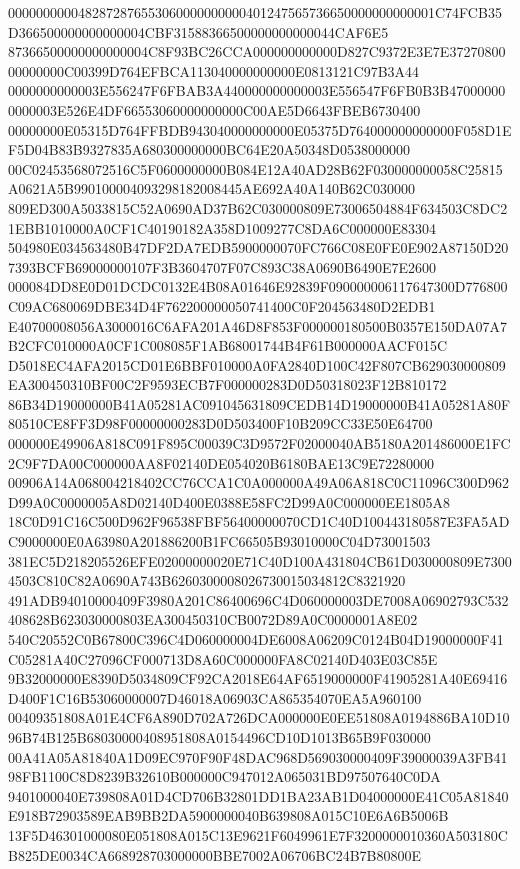 \documentclass[UTF8,fontset=fandol,zihao=-4,a4paper]{ctexart}
\begin{document}
{{0000000000482872876553060000000000401247565736650000000000001C74FCB35D366500000000000004CBF31588366500000000000044CAF6E5
87366500000000000004C8F93BC26CCA000000000000D827C9372E3E7E3727080000000000C00399D764EFBCA113040000000000E0813121C97B3A44
0000000000003E556247F6FBAB3A440000000000003E556547F6FB0B3B470000000000003E526E4DF66553060000000000C00AE5D6643FBEB6730400
00000000E05315D764FFBDB943040000000000E05375D764000000000000F058D1EF5D04B83B9327835A680300000000BC64E20A50348D0538000000
00C02453568072516C5F0600000000B084E12A40AD28B62F030000000058C25815A0621A5B990100004093298182008445AE692A40A140B62C030000
809ED300A5033815C52A0690AD37B62C030000809E73006504884F634503C8DC21EBB1010000A0CF1C40190182A358D1009277C8DA6C000000E83304
504980E034563480B47DF2DA7EDB5900000070FC766C08E0FE0E902A87150D207393BCFB69000000107F3B3604707F07C893C38A0690B6490E7E2600
000084DD8E0D01DCDC0132E4B08A01646E92839F090000006117647300D776800C09AC680069DBE34D4F762200000050741400C0F204563480D2EDB1
E40700008056A3000016C6AFA201A46D8F853F000000180500B0357E150DA07A7B2CFC010000A0CF1C008085F1AB68001744B4F61B000000AACF015C
D5018EC4AFA2015CD01E6BBF010000A0FA2840D100C42F807CB629030000809EA300450310BF00C2F9593ECB7F000000283D0D50318023F12B810172
86B34D19000000B41A05281AC091045631809CEDB14D19000000B41A05281A80F80510CE8FF3D98F00000000283D0D503400F10B209CC33E50E64700
000000E49906A818C091F895C00039C3D9572F02000040AB5180A201486000E1FC2C9F7DA00C000000AA8F02140DE054020B6180BAE13C9E72280000
00906A14A068004218402CC76CCA1C0A000000A49A06A818C0C11096C300D962D99A0C0000005A8D02140D400E0388E58FC2D99A0C000000EE1805A8
18C0D91C16C500D962F96538FBF56400000070CD1C40D100443180587E3FA5ADC9000000E0A63980A201886200B1FC66505B93010000C04D73001503
381EC5D218205526EFE02000000020E71C40D100A431804CB61D030000809E73004503C810C82A0690A743B6260300008026730015034812C8321920
491ADB94010000409F3980A201C86400696C4D060000003DE7008A06902793C532408628B623030000803EA300450310CB0072D89A0C0000001A8E02
540C20552C0B67800C396C4D060000004DE6008A06209C0124B04D19000000F41C05281A40C27096CF000713D8A60C000000FA8C02140D403E03C85E
9B32000000E8390D5034809CF92CA2018E64AF6519000000F41905281A40E69416D400F1C16B53060000007D46018A06903CA865354070EA5A960100
00409351808A01E4CF6A890D702A726DCA000000E0EE51808A0194886BA10D1096B74B125B68030000408951808A0154496CD10D1013B65B9F030000
00A41A05A81840A1D09EC970F90F48DAC968D569030000409F39000039A3FB4198FB1100C8D8239B32610B000000C947012A065031BD97507640C0DA
9401000040E739808A01D4CD706B32801DD1BA23AB1D04000000E41C05A81840E918B72903589EAB9BB2DA5900000040B639808A015C10E6A6B5006B
13F5D46301000080E051808A015C13E9621F6049961E7F3200000010360A503180CB825DE0034CA668928703000000BBE7002A06706BC24B7B80800E
}}
\end{document}
